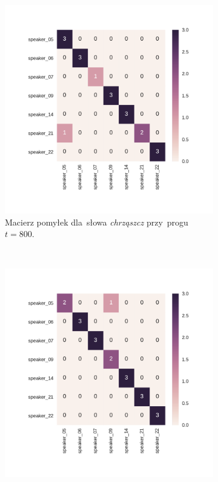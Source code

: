 \documentclass[11pt,a4paper]{article}
\begin{document}
\begin{figure}
\begin{subfigure}[t]{0.45\textwidth}
        \includegraphics[width=\textwidth]{res/plots/confusion_matrix_chrzaszcz.pdf}
        \caption{Macierz pomyłek dla~słowa \emph{chrząszcz} przy~progu~$t = 800$.}
    \end{subfigure}
    \\
    \begin{subfigure}[t]{0.45\textwidth}
        \includegraphics[width=\textwidth]{res/plots/confusion_matrix_poniedzialek.pdf}

\end{subfigure}
\end{figure}
\end{document}
